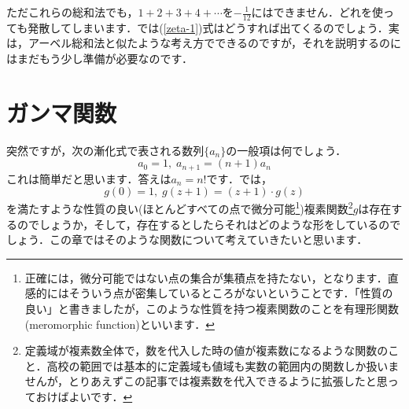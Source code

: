 \documentclass[./main]{subfile}
\begin{document}
ただこれらの総和法でも，$1+2+3+4+\cdots$を$-\frac{1}{12}$にはできません．どれを使っても発散してしまいます．では(\ref{zeta-1})式はどうすれば出てくるのでしょう．実は，アーベル総和法と似たような考え方でできるのですが，それを説明するのにはまだもう少し準備が必要なのです．

\section{ガンマ関数}

突然ですが，次の漸化式で表される数列$\{a_n\}$の一般項は何でしょう．
\[
a_0=1,\;a_{n+1}=(n+1)a_n
\]
これは簡単だと思います．答えは$a_n=n!$です．では，
\begin{equation}\label{gamma1}
g(0)=1,\;g(z+1)=(z+1)\cdot g(z)
\end{equation}
を満たすような性質の良い(ほとんどすべての点で微分可能\footnote{正確には，微分可能ではない点の集合が集積点を持たない，となります．直感的にはそういう点が密集しているところがないということです．「性質の良い」と書きましたが，このような性質を持つ複素関数のことを有理形関数(meromorphic function)といいます．})複素関数\footnote{定義域が複素数全体で，数を代入した時の値が複素数になるような関数のこと．高校の範囲では基本的に定義域も値域も実数の範囲内の関数しか扱いませんが，とりあえずこの記事では複素数を代入できるように拡張したと思っておけばよいです．}$g$は存在するのでしょうか，そして，存在するとしたらそれはどのような形をしているのでしょう．この章ではそのような関数について考えていきたいと思います．
\end{document}
